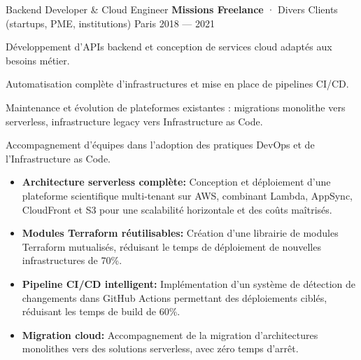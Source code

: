 \documentclass[11pt, a4paper]{awesome-cv}
\begin{document}
\cventry
  {Backend Developer \& Cloud Engineer}
  {\textbf{Missions Freelance} · Divers Clients (startups, PME, institutions)}
  {Paris}
  {2018 — 2021}
  {\begin{cvitems}
    \item Développement d'APIs backend et conception de services cloud adaptés aux besoins métier.
    \item Automatisation complète d'infrastructures et mise en place de pipelines CI/CD.
    \item Maintenance et évolution de plateformes existantes : migrations monolithe vers serverless, infrastructure legacy vers Infrastructure as Code.
    \item Accompagnement d'équipes dans l'adoption des pratiques DevOps et de l'Infrastructure as Code.
  \end{cvitems}}

\newpage


\begin{cvskills}
\end{cvskills}


\begin{cvparagraph}
\begin{itemize}[leftmargin=2ex, nosep, noitemsep]
  \item \textbf{Architecture serverless complète:} Conception et déploiement d'une plateforme scientifique multi-tenant sur AWS, combinant Lambda, AppSync, CloudFront et S3 pour une scalabilité horizontale et des coûts maîtrisés.
  \item \textbf{Modules Terraform réutilisables:} Création d'une librairie de modules Terraform mutualisés, réduisant le temps de déploiement de nouvelles infrastructures de 70\%.
  \item \textbf{Pipeline CI/CD intelligent:} Implémentation d'un système de détection de changements dans GitHub Actions permettant des déploiements ciblés, réduisant les temps de build de 60\%.
  \item \textbf{Migration cloud:} Accompagnement de la migration d'architectures monolithes vers des solutions serverless, avec zéro temps d'arrêt.
\end{itemize}
\end{cvparagraph}
\end{document}
